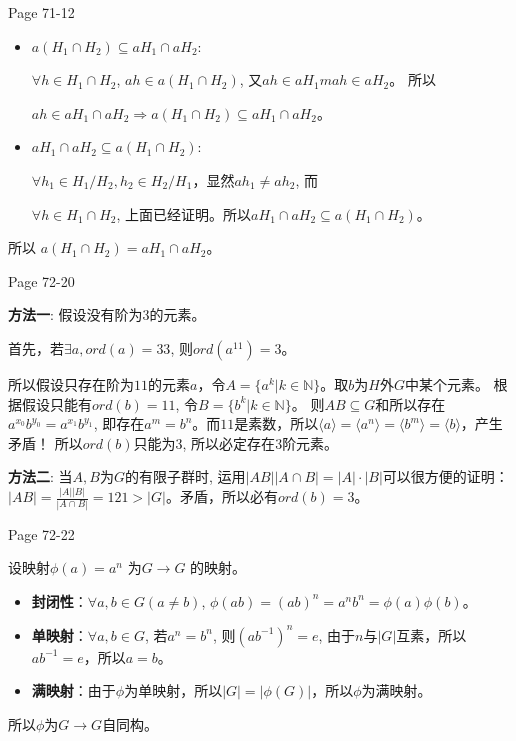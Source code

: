 \documentclass{ximera}
\begin{document}
\begin{problem} Page 71-12
    \begin{solution}
        \begin{itemize}
            \item $a(H_1 \cap H_2) \subseteq aH_1 \cap aH_2$:
            
            $\forall h \in H_1 \cap H_2$, $ah \in a(H_1 \cap H_2)$, 又$ah \in aH_1m ah \in aH_2$。 所以

            $ah \in aH_1 \cap aH_2 \Rightarrow a(H_1 \cap H_2) \subseteq aH_1 \cap aH_2$。
            \item $aH_1 \cap aH_2 \subseteq a(H_1 \cap H_2)$:
                
            $\forall h_1 \in H_1 / H_2, h_2 \in H_2 / H_1$，显然$ah_1 \not= ah_2$, 而

            $\forall h \in H_1 \cap H_2$, 上面已经证明。所以$aH_1 \cap aH_2 \subseteq a(H_1 \cap H_2)$。
        \end{itemize}
        所以 $a(H_1 \cap H_2) = aH_1 \cap aH_2$。
    \end{solution}
\end{problem}
 
\begin{problem} Page 72-20
    \begin{solution}
        \textbf{方法一}:
        假设没有阶为$3$的元素。

        首先，若$\exists a, ord(a) = 33$, 则$ord(a^{11}) = 3$。

        所以假设只存在阶为$11$的元素$a$，令$A=\{a^k|k \in \mathbb{N}\}$。取$b$为$H$外$G$中某个元素。 根据假设只能有$ord(b)=11$, 令$B=\{b^k|k \in \mathbb{N}\}$。
        则$AB \subseteq G$和所以存在$a^{x_0}b^{y_0}=a^{x_1}b^{y_1}$, 即存在$a^m=b^n$。而$11$是素数，所以$\langle a \rangle = \langle a^n \rangle = \langle b^m \rangle = \langle b \rangle$，产生矛盾！
        所以$ord(b)$只能为$3$, 所以必定存在$3$阶元素。

        \textbf{方法二}:
        当$A,B$为$G$的有限子群时, 运用$|AB||A\cap B|=|A|\cdot|B|$可以很方便的证明：
        $|AB| = \frac {|A||B|} {|A \cap B|} = 121 > |G|$。矛盾，所以必有$ord(b)=3$。
        


    \end{solution}
\end{problem}

\begin{problem} Page 72-22
    \begin{solution} 设映射$\phi(a) = a^n$ 为$G \rightarrow G$ 的映射。 
        \begin{itemize}
            \item \textbf{封闭性}：$\forall a, b \in G(a \not= b)$, $\phi(ab)=(ab)^n=a^nb^n=\phi(a)\phi(b)$。
            \item \textbf{单映射}：$\forall a, b \in G$, 若$a^n=b^n$, 则$(ab^{-1})^n=e$, 由于$n$与$|G|$互素，所以$ab^{-1}=e$，所以$a=b$。
            \item \textbf{满映射}：由于$\phi$为单映射，所以$|G|=|\phi(G)|$，所以$\phi$为满映射。
        \end{itemize}
        所以$\phi$为$G \rightarrow G$自同构。
    \end{solution}
\end{problem}
\end{document}
